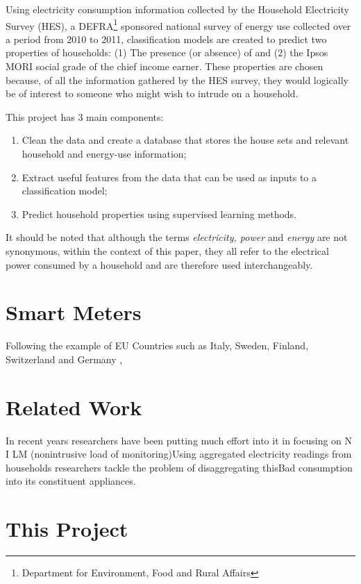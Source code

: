 Using electricity consumption information collected by the Household Electricity Survey (HES), a DEFRA\footnote{Department for Environment, Food and Rural Affairs} sponsored national survey of energy use collected over a period from 2010 to 2011, classification models are created to predict two properties of households: (1) The presence (or absence) of and (2) the Ipsos MORI social grade of the chief income earner. These properties are chosen because, of all the information gathered by the HES survey, they would logically be of interest to someone who might wish to intrude on a household.
\newline

This project has 3 main components:

\begin{enumerate}
\item Clean the data and create a database that stores the house sets and relevant household and energy-use information;
\item Extract useful features from the data that can be used as inputs to a classification model; 
\item Predict household properties using supervised learning methods.
\end{enumerate}

It should be noted that although the terms \textit{electricity, power} and \textit{energy} are not synonymous, within the context of this paper, they all refer to the electrical power consumed by a household and are therefore used interchangeably. 


\section{Smart Meters}
Following the example of EU Countries such as Italy, Sweden, Finland, Switzerland and Germany \cite{OfGEM}\cite{Vasc}, 
\section{Related Work}
In recent years researchers have been putting much effort into it in focusing on N I LM (nonintrusive load of monitoring)Using aggregated electricity readings from households researchers tackle the problem of disaggregating thisBad consumption into its constituent appliances.

\section{This Project}
